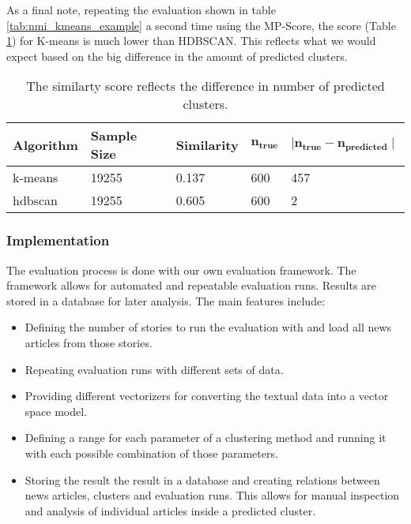 As a final note, repeating the evaluation shown in table \ref{tab:nmi_kmeans_example} a second time using the MP-Score, the score (Table \ref{tab:avg_predict_kmeans_example}) for K-means is much lower than HDBSCAN. This reflects what we would expect based on the big difference in the amount of predicted clusters.

\begin{table}[h]
    \centering
    \begin{tabular}{|l|l|l|l|l|}
    \hline
    \textbf{Algorithm} & \textbf{Sample Size} & \textbf{Similarity}  & $\mathbf{n_{true}}$ & $\mathbf{ \mid n_{true} - n_{predicted} \mid }$ \\ \hline
    k-means & 19255 & 0.137 & 600 & 457 \\ \hline
    hdbscan & 19255 & 0.605 & 600 & 2 \\ \hline
    \end{tabular}
    \caption{The similarty score reflects the difference in number of predicted clusters.}
    \label{tab:avg_predict_kmeans_example}
\end{table}

\subsubsection{Implementation}
The evaluation process is done with our own evaluation framework.
The framework allows for automated and repeatable evaluation runs.
Results are stored in a database for later analysis.
The main features include:

\begin{itemize}
    \item Defining the number of stories to run the evaluation with and load all news articles from those stories.
    \item Repeating evaluation runs with different sets of data.
    \item Providing different vectorizers for converting the textual data into a vector space model.
    \item Defining a range for each parameter of a clustering method and running it with each possible combination of those parameters.
    \item Storing the result the result in a database and creating relations between news articles, clusters and evaluation runs. This allows for manual inspection and analysis of individual articles inside a predicted cluster.
\end{itemize}


